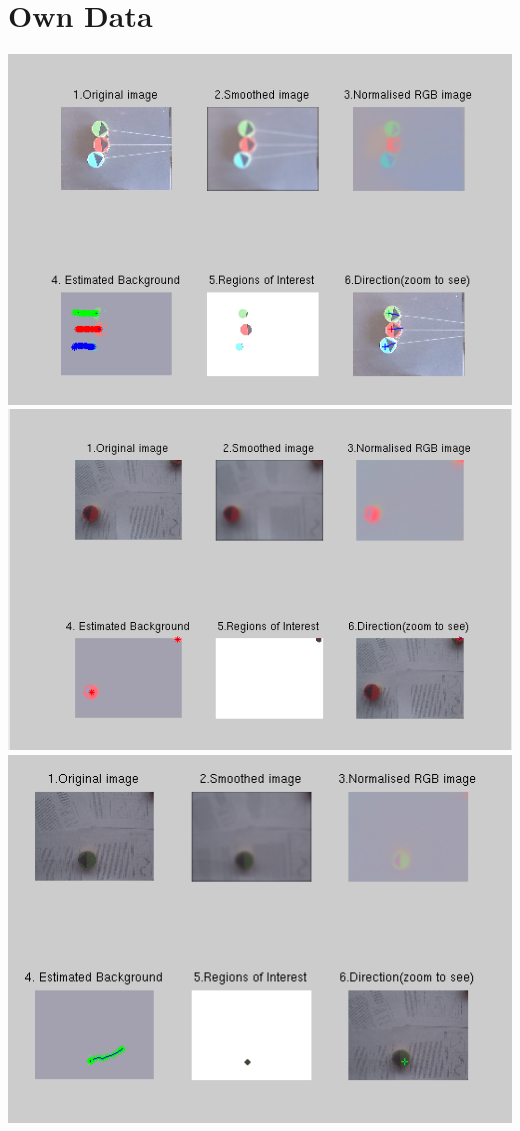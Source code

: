 \documentclass{report}
\begin{document}
\section{Own Data}
\includegraphics[scale=0.3]{data3}
\includegraphics[scale=0.3]{datasetred}
\includegraphics[scale=0.3]{datasetgreen}
\end{document}
